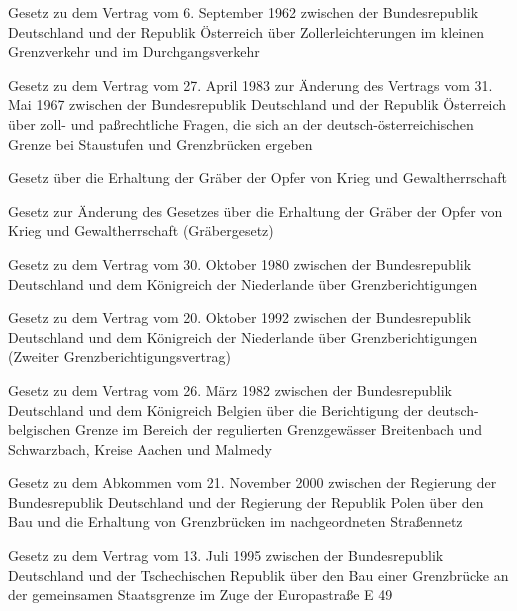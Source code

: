 \item[{GrAbfertVtrAUT1962G}] Gesetz zu dem Vertrag vom 6. September 1962 zwischen der Bundesrepublik Deutschland und der Republik Österreich über Zollerleichterungen im kleinen Grenzverkehr und im Durchgangsverkehr

\item[{GrAbfertVtrAUT1967ÄndVtrG}] Gesetz zu dem Vertrag vom 27. April 1983 zur Änderung des Vertrags vom 31. Mai 1967 zwischen der Bundesrepublik Deutschland und der Republik Österreich über zoll- und paßrechtliche Fragen, die sich an der deutsch-österreichischen Grenze bei Staustufen und Grenzbrücken ergeben

\item[{GräbG}] Gesetz über die Erhaltung der Gräber der Opfer von Krieg und Gewaltherrschaft

\item[{GräbGÄndG}] Gesetz zur Änderung des Gesetzes über die Erhaltung der Gräber der Opfer von Krieg und Gewaltherrschaft (Gräbergesetz)

\item[{GrBerichtVtrNLD1G}] Gesetz zu dem Vertrag vom 30. Oktober 1980 zwischen der Bundesrepublik Deutschland und dem Königreich der Niederlande über Grenzberichtigungen

\item[{GrBerichtVtrNLD2G}] Gesetz zu dem Vertrag vom 20. Oktober 1992 zwischen der Bundesrepublik Deutschland und dem Königreich der Niederlande über Grenzberichtigungen (Zweiter Grenzberichtigungsvertrag)

\item[{GrBerKrAC-MalVtrBELG}] Gesetz zu dem Vertrag vom 26. März 1982 zwischen der Bundesrepublik Deutschland und dem Königreich Belgien über die Berichtigung der deutsch-belgischen Grenze im Bereich der regulierten Grenzgewässer Breitenbach und Schwarzbach, Kreise Aachen und Malmedy

\item[{GrBrückAbk2000POLG}] Gesetz zu dem Abkommen vom 21. November 2000 zwischen der Regierung der Bundesrepublik Deutschland und der Regierung der Republik Polen über den Bau und die Erhaltung von Grenzbrücken im nachgeordneten Straßennetz

\item[{GrBrückAbkCESG}] Gesetz zu dem Vertrag vom 13. Juli 1995 zwischen der Bundesrepublik Deutschland und der Tschechischen Republik über den Bau einer Grenzbrücke an der gemeinsamen Staatsgrenze im Zuge der Europastraße E 49

